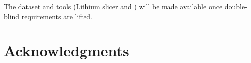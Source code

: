 \documentclass{article}
\begin{document}
The dataset and tools (Lithium slicer and \comb{}) will be made
available once double-blind requirements are lifted.


\section*{Acknowledgments}

{
  \small
  \balance
  
  
}
\end{document}
